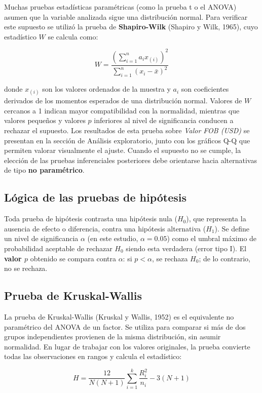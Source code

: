 \documentclass[12pt]{article}
\begin{document}
Muchas pruebas estadísticas paramétricas (como la prueba t o el ANOVA)
asumen que la variable analizada sigue una distribución normal. Para
verificar este supuesto se utilizó la prueba de \textbf{Shapiro-Wilk}
(Shapiro y Wilk, 1965), cuyo estadístico \(W\) se calcula como:

\[
W = \frac{\left( \sum_{i=1}^{n} a_i x_{(i)} \right)^2}{\sum_{i=1}^{n} (x_i - \bar{x})^2}
\]

donde \(x_{(i)}\) son los valores ordenados de la muestra y \(a_i\)
son coeficientes derivados de los momentos esperados de una
distribución normal. Valores de \(W\) cercanos a 1 indican mayor
compatibilidad con la normalidad, mientras que valores pequeños y
valores \(p\) inferiores al nivel de significancia conducen a rechazar
el supuesto. Los resultados de esta prueba sobre \emph{Valor FOB (USD)}
se presentan en la sección de Análisis exploratorio, junto con los
gráficos Q-Q que permiten valorar visualmente el ajuste. Cuando el
supuesto no se cumple, la elección de las pruebas inferenciales
posteriores debe orientarse hacia alternativas de tipo
\textbf{no paramétrico}.

\subsection*{Lógica de las pruebas de hipótesis}

Toda prueba de hipótesis contrasta una hipótesis nula (\(H_0\)), que
representa la ausencia de efecto o diferencia, contra una hipótesis
alternativa (\(H_1\)). Se define un nivel de significancia
\(\alpha\) (en este estudio, \(\alpha = 0.05\)) como el umbral máximo
de probabilidad aceptable de rechazar \(H_0\) siendo esta verdadera
(error tipo I). El \textbf{valor \(p\)} obtenido se compara contra
\(\alpha\): si \(p < \alpha\), se rechaza \(H_0\); de lo contrario, no
se rechaza.

\subsection*{Prueba de Kruskal-Wallis}

La prueba de Kruskal-Wallis (Kruskal y Wallis, 1952) es el equivalente
no paramétrico del ANOVA de un factor. Se utiliza para comparar si
más de dos grupos independientes provienen de la misma distribución,
sin asumir normalidad. En lugar de trabajar con los valores originales,
la prueba convierte todas las observaciones en rangos y calcula el
estadístico:

\[
H = \frac{12}{N(N+1)} \sum_{i=1}^{k} \frac{R_i^2}{n_i} - 3(N+1)
\]
\end{document}
